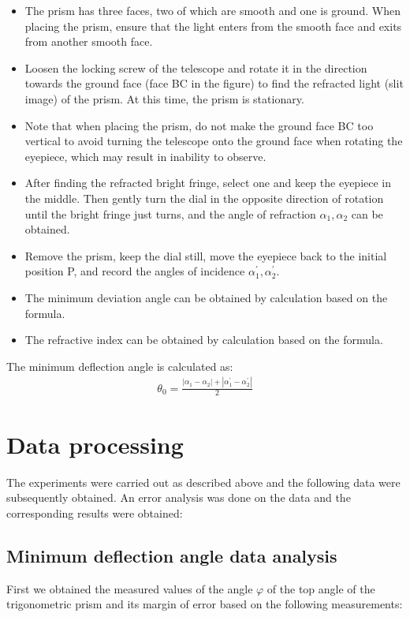 \documentclass[UTF8]{article}
\begin{document}
   \begin{itemize}
       \item The prism has three faces, two of which are smooth and one is ground. When placing the prism, ensure that the light enters from the smooth face and exits from another smooth face.
       \item Loosen the locking screw of the telescope and rotate it in the direction towards the ground face (face BC in the figure) to find the refracted light (slit image) of the prism. At this time, the prism is stationary.
       \item Note that when placing the prism, do not make the ground face BC too vertical to avoid turning the telescope onto the ground face when rotating the eyepiece, which may result in inability to observe.
       \item After finding the refracted bright fringe, select one and keep the eyepiece in the middle. Then gently turn the dial in the opposite direction of rotation until the bright fringe just turns, and the angle of refraction $\alpha _1,\alpha _2$ can be obtained.
       \item Remove the prism, keep the dial still, move the eyepiece back to the initial position P, and record the angles of incidence $\alpha ^{'} _1,\alpha ^{'} _2$.
       \item The minimum deviation angle can be obtained by calculation based on the formula.
       \item The refractive index can be obtained by calculation based on the formula.
   \end{itemize}
   
    The minimum deflection angle is calculated as:
    \begin{eqnarray}
    \theta _{0} = \frac{\left | \alpha _1-\alpha _2 \right | +\left | \alpha ^{'} _1-\alpha ^{'} _2 \right | }{2} 
    \end{eqnarray}
    
    
    
	
	\section{Data processing}
	The experiments were carried out as described above and the following data were subsequently obtained. An error analysis was done on the data and the corresponding results were obtained:
	\subsection{Minimum deflection angle data analysis}
	First we obtained the measured values of the angle $\varphi $ of the top angle of the trigonometric prism and its margin of error based on the following measurements:
   
\end{document}
